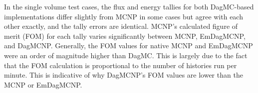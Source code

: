 \documentclass{anstrans}
\begin{document}
In the single volume test cases, the flux and energy tallies for both DagMC-based implementations differ slightly from MCNP in some cases but agree with each other exactly, and the tally errors are identical. MCNP's calculated figure of merit (FOM) for each tally varies significantly between MCNP, EmDagMCNP, and DagMCNP. Generally, the FOM values for native MCNP and EmDagMCNP were an order of magnitude higher than DagMC. This is largely due to the fact that the FOM calculation is proportional to the number of histories run per minute. This is indicative of why DagMCNP's FOM values are lower than the MCNP or EmDagMCNP.



                        






\end{document}
